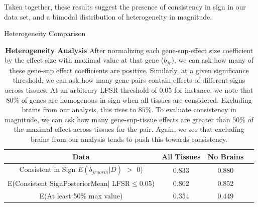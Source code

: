 Taken together, these results suggest the presence of consistency in sign in our data set, and a bimodal distribution of heterogeneity in magnitude.

\begin{table}[htbp]
\caption{Heterogeneity Comparison}
\centering
\begin{tabular}{c c c c}
\hline\hline
Data & All Tissues  & No Brains  \\ [0.5ex] %
\hline
Consistent in Sign $E(b_{jrnorm}|D)$ $>$ 0) &0.833&0.880 \\
E(Consistent SignPosteriorMean$\mid$ LFSR$\leq$0.05)&0.802&0.852\\
E(At least 50\% max value) &0.354&0.449\\
\hline
\end{tabular}
\label{table:het}
\caption{\textbf{Heterogeneity Analysis} After normalizing each gene-snp-effect size coefficient by the effect size with maximal value at that gene ($b_{jr}$), we can ask how many of these gene-snp effect coefficients are positive. Similarly, at a given significance threshold, we can ask how many gene-pairs contain effects of different signs across tissues. At an arbitrary LFSR threshold of 0.05 for instance, we note that $80\%$ of genes are homogenous in sign when all tissues are considered. Excluding brains from our analysis, this rises to $85\%$. To evaluate consistency in magnitude, we can ask how many gene-snp-tissue effects are greater than $50\%$ of the maximal effect across tissues for the pair. Again, we see that excluding brains from our analysis tends to push this towards consistency.}
\end{table} \newline




